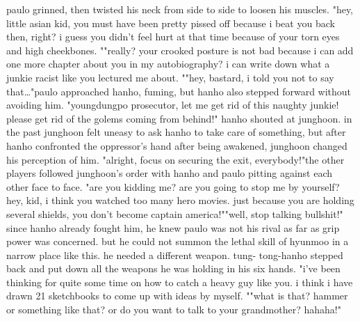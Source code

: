 paulo grinned, then twisted his neck from side to side to loosen his muscles.
"hey, little asian kid, you must have been pretty pissed off because i beat you back then, right? i guess you didn't feel hurt at that time because of your torn eyes and high cheekbones.
""really? your crooked posture is not bad because i can add one more chapter about you in my autobiography? i can write down what a junkie racist like you lectured me about.
""hey, bastard, i told you not to say that…"paulo approached hanho, fuming, but hanho also stepped forward without avoiding him.
"youngdungpo prosecutor, let me get rid of this naughty junkie! please get rid of the golems coming from behind!" hanho shouted at junghoon.
in the past junghoon felt uneasy to ask hanho to take care of something, but after hanho confronted the oppressor's hand after being awakened, junghoon changed his perception of him.
"alright, focus on securing the exit, everybody!"the other players followed junghoon's order with hanho and paulo pitting against each other face to face.
"are you kidding me? are you going to stop me by yourself? hey, kid, i think you watched too many hero movies.
 just because you are holding several shields, you don't become captain america!""well, stop talking bullshit!" since hanho already fought him, he knew paulo was not his rival as far as grip power was concerned.
 but he could not summon the lethal skill of hyunmoo in a narrow place like this.
 he needed a different weapon.
tung- tong-hanho stepped back and put down all the weapons he was holding in his six hands.
"i've been thinking for quite some time on how to catch a heavy guy like you.
 i think i have drawn 21 sketchbooks to come up with ideas by myself.
""what is that? hammer or something like that? or do you want to talk to your grandmother? hahaha!"

 